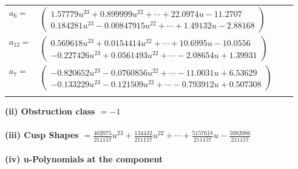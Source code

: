 \documentclass[1p]{elsarticle_modified}
\theoremstyle{definition}
\begin{document}
\begin{tabular}{m{7pt} m{180pt} m{7pt} m{180pt} }
\flushright $a_{6}=$&$\begin{pmatrix}1.57779 u^{23}+0.899999 u^{22}+\cdots+22.0974 u-11.2707\\0.184281 u^{23}-0.00847915 u^{22}+\cdots+1.49132 u-2.88168\end{pmatrix}$ \\
\flushright $a_{12}=$&$\begin{pmatrix}0.569618 u^{23}+0.0154414 u^{22}+\cdots+10.6995 u-10.0556\\-0.227426 u^{23}+0.0561493 u^{22}+\cdots-2.08654 u+1.39931\end{pmatrix}$ \\
\flushright $a_{7}=$&$\begin{pmatrix}-0.820652 u^{23}-0.0760856 u^{22}+\cdots-11.0031 u+6.53629\\-0.133229 u^{23}-0.121509 u^{22}+\cdots-0.793912 u+0.507308\end{pmatrix}$\\&\end{tabular}
\flushleft \textbf{(ii) Obstruction class $= -1$}\\~\\
\flushleft \textbf{(iii) Cusp Shapes $= \frac{402075}{211157} u^{23}+\frac{134432}{211157} u^{22}+\cdots+\frac{5157618}{211157} u-\frac{5082086}{211157}$}\\~\\
\newpage\renewcommand{\arraystretch}{1}
\flushleft \textbf{(iv) u-Polynomials at the component}\newline \\
\end{document}
